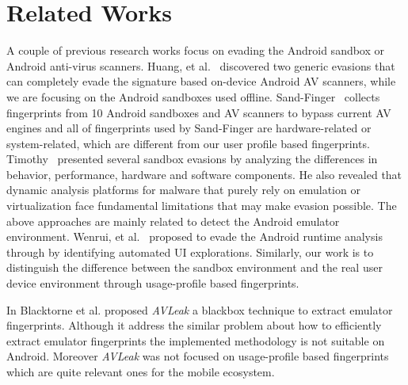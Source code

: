 \section{Related Works}
\label{sec:related}
A couple of previous research works focus on evading the Android sandbox or Android anti-virus scanners. Huang, et al.~\cite{huang2015towards} discovered two generic evasions that can completely evade the signature based on-device Android AV scanners, while we are focusing on the Android sandboxes used offline. Sand-Finger~\cite{Sand-Finger} collects fingerprints from 10 Android sandboxes and AV scanners to bypass current AV engines and all of fingerprints used by Sand-Finger are hardware-related or system-related, which are different from our user profile based  fingerprints. Timothy~\cite{Vidas} presented several sandbox evasions by analyzing the differences in behavior, performance, hardware and software components. He also revealed that dynamic analysis platforms for malware that purely rely on emulation or virtualization face fundamental limitations that may make evasion possible. The above approaches are mainly related to detect the Android emulator environment. Wenrui, et al.~\cite{Diao} proposed to evade the Android runtime analysis through by identifying automated UI explorations. Similarly, our work is to distinguish the difference between the sandbox environment and the real user device environment through usage-profile based fingerprints. 

In \cite{blackthorne2016avleak} Blacktorne et al. proposed \textit{AVLeak} a blackbox technique to extract emulator fingerprints. Although it address the similar problem about how to efficiently extract emulator fingerprints the implemented methodology is not suitable on Android. Moreover \textit{AVLeak} was not focused on usage-profile based fingerprints which are quite relevant ones for the mobile ecosystem.
